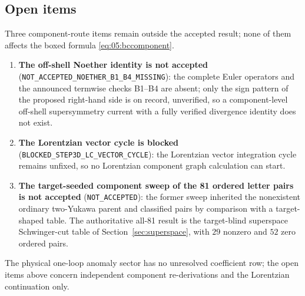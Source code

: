 \subsection{Open items}\label{sec:component:open}

\begin{remark}%
\label{rem:05:open}
Three component-route items remain outside the accepted result; none of them
affects the boxed formula \eqref{eq:05:bccomponent}.
\begin{enumerate}[label=(\roman*)]
\item \textbf{The off-shell Noether identity is not accepted}
(\texttt{NOT\_ACCEPTED\_NOETHER\_B1\_B4\_MISSING}): the complete Euler
operators and the announced termwise checks B1--B4 are absent; only the sign
pattern of the proposed right-hand side is on record, unverified, so a
component-level off-shell supersymmetry current with a fully verified
divergence identity does not exist.
\item \textbf{The Lorentzian vector cycle is blocked}
(\texttt{BLOCKED\_STEP3D\_LC\_VECTOR\_CYCLE}): the Lorentzian vector
integration cycle remains unfixed, so no Lorentzian component graph
calculation can start.
\item \textbf{The target-seeded component sweep of the 81 ordered letter pairs
is not accepted} (\texttt{NOT\_ACCEPTED}): the former sweep inherited the
nonexistent ordinary two-Yukawa parent and classified pairs by comparison with
a target-shaped table. The authoritative all-81 result is the target-blind
superspace Schwinger-cut table of Section~\ref{sec:superspace}, with $29$
nonzero and $52$ zero ordered pairs.
\end{enumerate}
The physical one-loop anomaly sector has no unresolved coefficient row; the
open items above concern independent component re-derivations and the
Lorentzian continuation only.
\end{remark}
